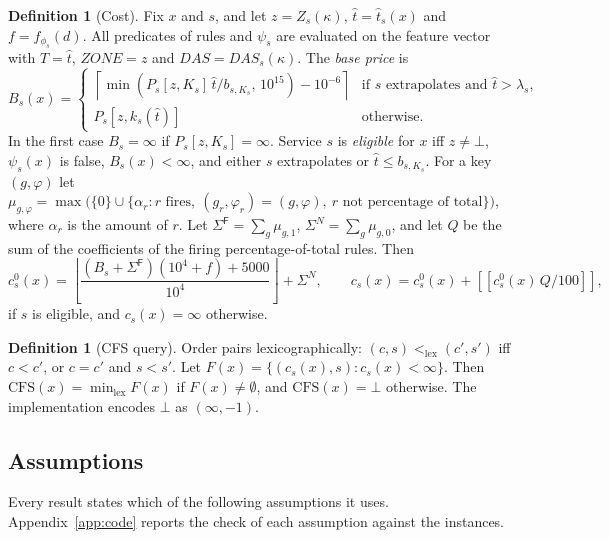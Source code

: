 \documentclass[11pt]{article}
\theoremstyle{definition}
\newtheorem{definition}[theorem]{Definition}
\theoremstyle{remark}
\newcommand{\lexlt}{\mathrel{<_{\mathrm{lex}}}}
\newcommand{\cfs}{\mathrm{CFS}}
\newcommand{\fl}[1]{\left\lfloor #1 \right\rfloor}
\newcommand{\ce}[1]{\left\lceil #1 \right\rceil}
\newcommand{\Fu}{\mathsf{F}}
\newcommand{\rnd}[1]{\llbracket #1 \rrbracket}
\providecommand{\llbracket}{[\![}
\providecommand{\rrbracket}{]\!]}
\begin{document}
\begin{definition}[Cost]\label{def:cost}
Fix $x$ and $s$, and let $z=Z_s(\kappa)$, $\hat t=\hat t_s(x)$ and $f=f_{\phi_s}(d)$. All
predicates of rules and $\psi_s$ are evaluated on the feature vector with $T=\hat t$,
$\mathit{ZONE}=z$ and $\mathit{DAS}=\mathit{DAS}_s(\kappa)$. The \emph{base price} is
\[
B_s(x)=\begin{cases}
\ce{\min(P_s[z,K_s]\,\hat t/b_{s,K_s},\,10^{15})-10^{-6}} & \text{if $s$ extrapolates and } \hat t>\lambda_s,\\
P_s[z,k_s(\hat t)] & \text{otherwise.}
\end{cases}
\]
In the first case $B_s=\infty$ if $P_s[z,K_s]=\infty$. Service $s$ is \emph{eligible} for $x$
iff $z\ne\bot$, $\psi_s(x)$ is false, $B_s(x)<\infty$, and either $s$ extrapolates or
$\hat t\le b_{s,K_s}$. For a key $(g,\varphi)$ let
$\mu_{g,\varphi}=\max\bigl(\{0\}\cup\{\alpha_r: r\text{ fires},\ (g_r,\varphi_r)=(g,\varphi),\ r\text{ not
percentage of total}\}\bigr)$, where $\alpha_r$ is the amount of $r$. Let
$\Sigma^\Fu=\sum_{g}\mu_{g,1}$, $\Sigma^N=\sum_g\mu_{g,0}$, and let $Q$ be the sum of the
coefficients of the firing percentage-of-total rules. Then
\begin{equation}\label{eq:cost}
c^0_s(x)=\fl{\frac{(B_s+\Sigma^\Fu)(10^4+f)+5000}{10^4}}+\Sigma^N,\qquad
c_s(x)=c^0_s(x)+\rnd{c^0_s(x)\,Q/100},
\end{equation}
if $s$ is eligible, and $c_s(x)=\infty$ otherwise.
\end{definition}

\begin{definition}[CFS query]\label{def:cfs}
Order pairs lexicographically: $(c,s)\lexlt(c',s')$ iff $c<c'$, or $c=c'$ and $s<s'$. Let
$F(x)=\{(c_s(x),s):c_s(x)<\infty\}$. Then $\cfs(x)=\min_{\mathrm{lex}}F(x)$ if
$F(x)\ne\emptyset$, and $\cfs(x)=\bot$ otherwise. The implementation encodes $\bot$ as
$(\infty,-1)$.
\end{definition}

\subsection{Assumptions}
Every result states which of the following assumptions it uses. Appendix~\ref{app:code}
reports the check of each assumption against the instances.
\end{document}
